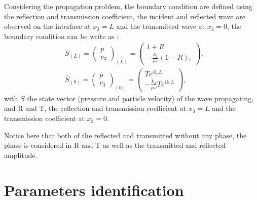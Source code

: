 \documentclass{article}
\begin{document}
    Considering the propagation problem, the boundary condition are defined using the reflection and transmission coefficient, the incident and reflected wave are observed on the interface at $x_3=L$ and the transmitted wave at $x_3=0$, the boundary condition can be write as :
     \begin{align}
    &\bar{S}_{(L)}=\begin{pmatrix}
    	p \\ v_3
    \end{pmatrix}_{(L)}=\begin{pmatrix}
    					    1+R \\ -\frac{k_3}{\rho \omega}(1-R),
    					\end{pmatrix},\label{BC_L} \\
  	&\bar{S}_{(0)}=\begin{pmatrix}
    	p \\ v_3
    \end{pmatrix}_{(0)}=\begin{pmatrix}
    						Te^{ik_3L} \\ -\frac{k_3}{\rho \omega}Te^{ik_3L}
    					\end{pmatrix},\label{BC_0}
    \end{align}                         
    with $\bar{S}$ the state vector (pressure and particle velocity) of the wave propagating, and R and T, the reflection and transmission coefficient at $x_3=L$ and the transmission coefficient at $x_3=0$.  
    
    Notice here that both of the reflected and transmitted without any phase, the phase is considered in R and T as well as the transmitted and reflected amplitude.
    
\section{Parameters identification}
\end{document}
